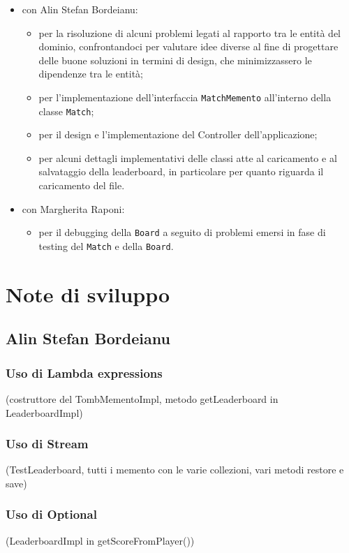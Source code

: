\documentclass[a4paper,12pt]{report}
\begin{document}
\begin{itemize}
	\item con Alin Stefan Bordeianu:
		\begin{itemize}
			\item per la risoluzione di alcuni problemi legati al rapporto tra le entità del dominio,
confrontandoci per valutare idee diverse al fine di progettare delle buone soluzioni in termini di design, che minimizzassero le dipendenze tra le entità;
			\item per l'implementazione dell'interfaccia \texttt{MatchMemento} all'interno della classe \texttt{Match};
			\item per il design e l'implementazione del Controller dell'applicazione;
			\item per alcuni dettagli implementativi delle classi atte al caricamento e al salvataggio della leaderboard, in particolare per quanto riguarda il caricamento del file.
		\end{itemize}
	\item con Margherita Raponi:
		\begin{itemize}
			\item per il debugging della \texttt{Board} a seguito di problemi emersi in fase di testing del \texttt{Match} e della \texttt{Board}.
		\end{itemize}
\end{itemize}


\section{Note di sviluppo}

\subsection{Alin Stefan Bordeianu}

\subsubsection{Uso di Lambda expressions}
(costruttore del TombMementoImpl, metodo getLeaderboard in LeaderboardImpl)

\subsubsection{Uso di Stream}
(TestLeaderboard, tutti i memento con le varie collezioni, vari metodi restore e save)

\subsubsection{Uso di Optional}
(LeaderboardImpl in getScoreFromPlayer())
\end{document}
